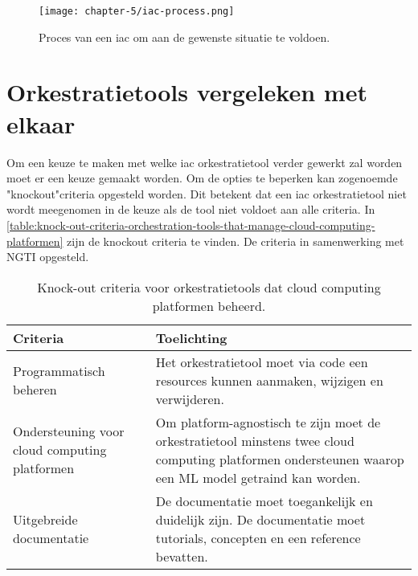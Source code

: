 \begin{figure}[hbt!]
  \centering
  \texttt{[image: chapter-5/iac-process.png]}
  \caption{Proces van een \acrfull{iac} om aan de gewenste situatie te voldoen.}
  \label{fig:ch5-iac-process}
\end{figure}

\section{Orkestratietools vergeleken met elkaar}\label{subsec:ch5-orkestratietools-vergeleken-met-elkaar}
Om een keuze te maken met welke \Acrshort{iac} orkestratietool verder gewerkt zal worden moet er een keuze gemaakt worden. Om de opties te beperken kan zogenoemde "knockout"\space criteria opgesteld worden. Dit betekent dat een \Acrshort{iac} orkestratietool niet wordt meegenomen in de keuze als de tool niet voldoet aan alle criteria. In \autoref{table:knock-out-criteria-orchestration-tools-that-manage-cloud-computing-platformen} zijn de knockout criteria te vinden. De criteria in samenwerking met NGTI opgesteld. 

\begin{table}[hbt!]
  \centering
  \begin{tabular}{|p{.2\linewidth}|p{.69\linewidth}|}
  \hline
  \textbf{Criteria} & \textbf{Toelichting} \\ \hline
    Programmatisch beheren
    &
    Het orkestratietool moet via code een resources kunnen aanmaken, wijzigen en verwijderen. 
    \\ \hline

    Ondersteuning voor cloud \newline computing \newline platformen
    &
    Om platform-agnostisch te zijn moet de orkestratietool minstens twee cloud computing platformen ondersteunen waarop een ML model getraind kan worden.
    \\ \hline

    Uitgebreide \newline documentatie
    &
    De documentatie moet toegankelijk en duidelijk zijn. De documentatie moet tutorials, concepten en een reference bevatten.
    \\ \hline
  \end{tabular}
  \caption{Knock-out criteria voor orkestratietools dat cloud computing platformen beheerd.}
  \label{table:knock-out-criteria-orchestration-tools-that-manage-cloud-computing-platformen}
\end{table}

